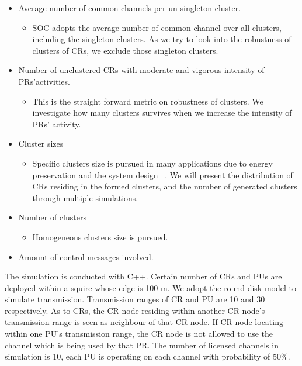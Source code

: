 \begin{itemize}
\item Average number of common channels per un-singleton cluster. 
\begin{itemize}
\item SOC adopts the average number of common channel over all clusters, \ie including the singleton clusters. As we try to look into the robustness of clusters of CRs, we exclude those singleton clusters.
\end{itemize}  

\item Number of unclustered CRs with moderate and vigorous intensity of PRs'activities.
\begin{itemize}
\item This is the straight forward metric on robustness of clusters.
We investigate how many clusters survives when we increase the intensity of PRs' activity.
\end{itemize}

\item Cluster sizes 
\begin{itemize}
\item Specific clusters size is pursued in many applications due to energy preservation and the system design ~\cite{clustering_globecom11}.
We will present the distribution of CRs residing in the formed clusters, and the number of generated clusters through multiple simulations.
\end{itemize}

\item Number of clusters	
\begin{itemize}
\item Homogeneous clusters size is pursued.
\end{itemize}

\item Amount of control messages involved.
\end{itemize}

The simulation is conducted with C++. 
Certain number of CRs and PUs are deployed within a squire whose edge is 100 m.
We adopt the round disk model to simulate transmission.
Transmission ranges of CR and PU are 10 and 30 respectively.
As to CRs, the CR node residing within another CR node's transmission range is seen as neighbour of that CR node.
If CR node locating within one PU's transmission range, the CR node is not allowed to use the channel which is being used by that PR.
The number of licensed channels in simulation is 10, each PU is operating on each channel with probability of 50\%.


